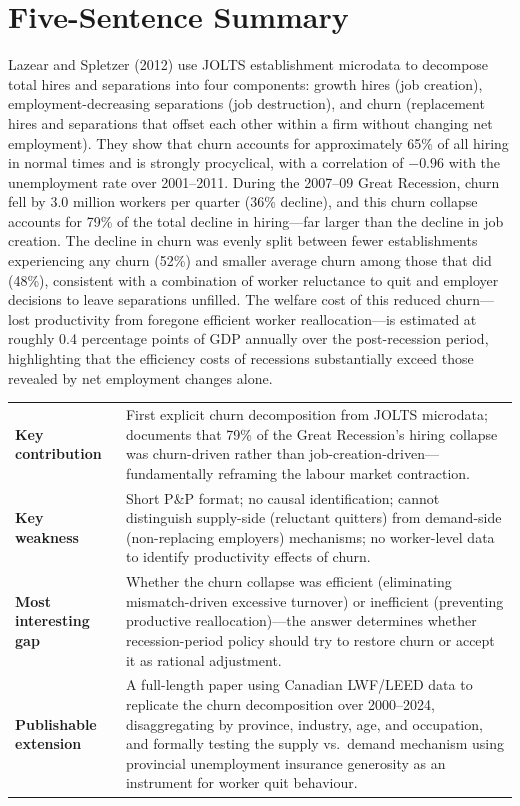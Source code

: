 \section*{Five-Sentence Summary}

Lazear and Spletzer (2012) use JOLTS establishment microdata to decompose
total hires and separations into four components: growth hires (job creation),
employment-decreasing separations (job destruction), and churn (replacement
hires and separations that offset each other within a firm without changing
net employment). They show that churn accounts for approximately 65\% of all
hiring in normal times and is strongly procyclical, with a correlation of
$-0.96$ with the unemployment rate over 2001--2011. During the 2007--09 Great
Recession, churn fell by 3.0 million workers per quarter (36\% decline), and
this churn collapse accounts for 79\% of the total decline in hiring---far
larger than the decline in job creation. The decline in churn was evenly split
between fewer establishments experiencing any churn (52\%) and smaller average
churn among those that did (48\%), consistent with a combination of worker
reluctance to quit and employer decisions to leave separations unfilled. The
welfare cost of this reduced churn---lost productivity from foregone efficient
worker reallocation---is estimated at roughly 0.4 percentage points of GDP
annually over the post-recession period, highlighting that the efficiency costs
of recessions substantially exceed those revealed by net employment changes
alone.

\vspace{6pt}
\begin{quickref}
\begin{tabularx}{\linewidth}{@{}lX@{}}
\textbf{Key contribution} &
  First explicit churn decomposition from JOLTS microdata; documents that
  79\% of the Great Recession's hiring collapse was churn-driven rather than
  job-creation-driven---fundamentally reframing the labour market contraction. \\[4pt]
\textbf{Key weakness} &
  Short P\&P format; no causal identification; cannot distinguish supply-side
  (reluctant quitters) from demand-side (non-replacing employers) mechanisms;
  no worker-level data to identify productivity effects of churn. \\[4pt]
\textbf{Most interesting gap} &
  Whether the churn collapse was efficient (eliminating mismatch-driven
  excessive turnover) or inefficient (preventing productive reallocation)---the
  answer determines whether recession-period policy should try to restore churn
  or accept it as rational adjustment. \\[4pt]
\textbf{Publishable extension} &
  A full-length paper using Canadian LWF/LEED data to replicate the churn
  decomposition over 2000--2024, disaggregating by province, industry, age,
  and occupation, and formally testing the supply vs.\ demand mechanism using
  provincial unemployment insurance generosity as an instrument for worker
  quit behaviour.
\end{tabularx}
\end{quickref}
